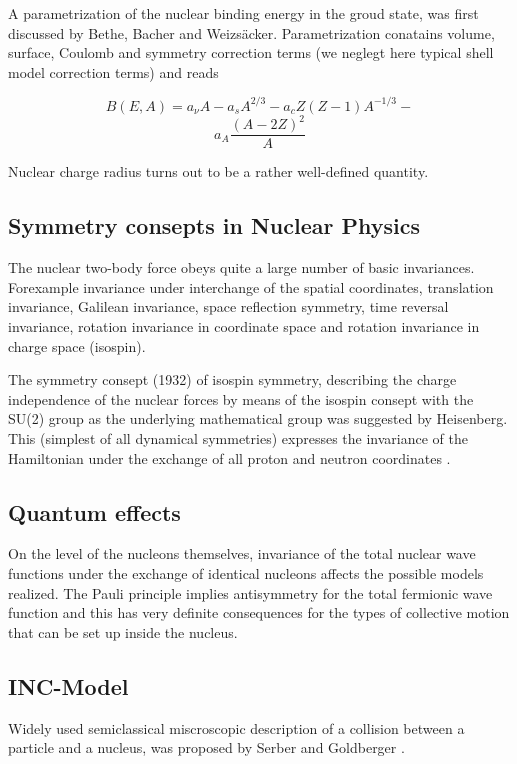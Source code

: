 A parametrization of the nuclear binding energy in the groud state,
was first discussed by Bethe, Bacher and Weizs\"{a}cker.
Parametrization conatains volume, surface, Coulomb and symmetry correction terms (we neglegt here typical shell model correction terms) and reads

$$B(E, A) = a_{\nu} A - a_{s} A^{2/3} - a_{c} Z(Z-1)A^{-1/3} -$$ 
\begin{equation}
  a_{A}\frac{(A-2Z)^2}{A}
\end{equation}

Nuclear charge radius turns out to be a rather well-defined quantity.

\subsection{Symmetry consepts in Nuclear Physics}
The nuclear two-body force obeys quite a large number of basic invariances.
Forexample invariance under interchange of the spatial coordinates, translation invariance, Galilean invariance, space reflection symmetry, time reversal invariance, rotation invariance in coordinate space and rotation invariance in charge space (isospin).

The symmetry consept (1932) of isospin symmetry, 
describing the charge independence of the nuclear forces by means of the isospin consept with the SU(2) group as the underlying mathematical group was suggested by Heisenberg. 
This (simplest of all dynamical symmetries) expresses the invariance of the Hamiltonian under the exchange of all proton and neutron coordinates \cite{heyde98}.

\subsection{Quantum effects}

On the level of the nucleons themselves, invariance of the total nuclear wave functions under the exchange of identical nucleons affects the possible models realized. 
The Pauli principle implies antisymmetry for the total fermionic wave function and this has very definite consequences for the types of collective motion that can be set up inside the nucleus.


\subsection{INC-Model}

Widely used semiclassical miscroscopic description of a collision between a particle and a nucleus, 
was proposed by Serber \cite{serber47} and Goldberger \cite{goldberger48}.
